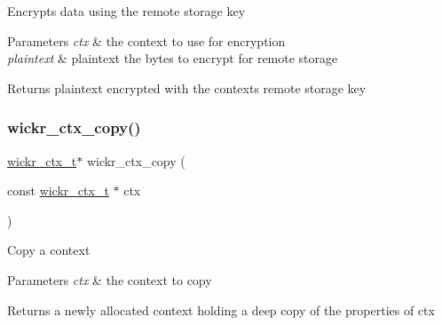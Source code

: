 Encrypts data using the remote storage key


\begin{DoxyParams}{Parameters}
{\em ctx} & the context to use for encryption \\
\hline
{\em plaintext} & plaintext the bytes to encrypt for remote storage \\
\hline
\end{DoxyParams}
\begin{DoxyReturn}{Returns}
\textquotesingle{}plaintext\textquotesingle{} encrypted with the context\textquotesingle{}s remote storage key 
\end{DoxyReturn}
\mbox{\label{group__wickr__ctx_gaaa74a32619fb3b382fbeeeddc425a910}} 
\subsubsection{\texorpdfstring{wickr\+\_\+ctx\+\_\+copy()}{wickr\_ctx\_copy()}}
{\footnotesize\ttfamily \mbox{\hyperlink{structwickr__ctx}{wickr\+\_\+ctx\+\_\+t}}$\ast$ wickr\+\_\+ctx\+\_\+copy (\begin{DoxyParamCaption}\item[{const \mbox{\hyperlink{structwickr__ctx}{wickr\+\_\+ctx\+\_\+t}} $\ast$}]{ctx }\end{DoxyParamCaption})}

Copy a context


\begin{DoxyParams}{Parameters}
{\em ctx} & the context to copy \\
\hline
\end{DoxyParams}
\begin{DoxyReturn}{Returns}
a newly allocated context holding a deep copy of the properties of \textquotesingle{}ctx\textquotesingle{} 
\end{DoxyReturn}
\mbox{\label{group__wickr__ctx_ga085975d71519bf5729a7cf264a5f7876}} 
